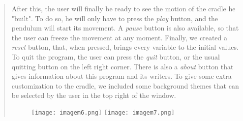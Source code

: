 \documentclass{article}
\begin{document}
\begin{quote}
After this, the user will finally be ready to see the motion of the cradle he "built". To do so, he will only have to press the \textit{play} button, and the pendulum will start its movement. A \textit{pause} button is also available, so that the user can freeze the movement at any moment. Finally, we created a \textit{reset} button, that, when pressed, brings every variable to the initial values. To quit the program, the user can press the \textit{quit} button, or the usual quitting button on the left right corner. There is also a \textit{about} button that gives information about this program and its writers. 
To give some extra customization to the cradle, we included some background themes that can be selected by the user in the top right of the window.
\begin{figure}[hb]
  \centering
  \texttt{[image: imagem6.png]}
  \texttt{[image: imagem7.png]}
\end{figure}

\noindent\hrulefill
\end{quote}
\end{document}
